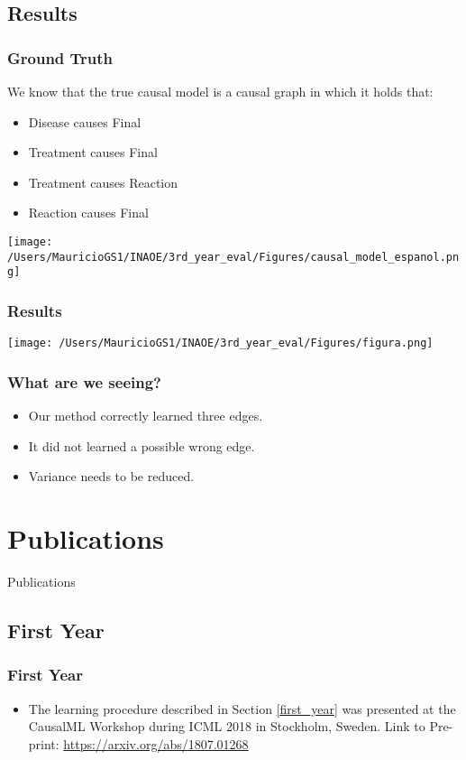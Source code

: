 \documentclass{beamer}
\theoremstyle{plain}
\begin{document}
\subsection{Results}
\begin{frame}
\frametitle{Ground Truth}
We know that the true causal model is a causal graph in which it holds that:
\begin{itemize}
\item Disease causes Final
\item Treatment causes Final
\item Treatment causes Reaction
\item Reaction causes Final
\end{itemize}
\end{frame}

\begin{frame}
\texttt{[image: /Users/MauricioGS1/INAOE/3rd\_year\_eval/Figures/causal\_model\_espanol.png]}
\end{frame}

\begin{frame}
\frametitle{Results}
\texttt{[image: /Users/MauricioGS1/INAOE/3rd\_year\_eval/Figures/figura.png]}
\end{frame}

\begin{frame}
\frametitle{What are we seeing?}
\begin{itemize}
\item Our method correctly learned three edges.
\item It did not learned a possible wrong edge. 
\item Variance needs to be reduced. 
\end{itemize}
\end{frame}

\section{Publications}
\begin{frame}
\begin{center}
\LARGE{Publications}
\end{center}
\end{frame}

\subsection{First Year}
\begin{frame}
\frametitle{First Year}
\begin{itemize}
\item The learning procedure described in Section \ref{first_year} was presented at the CausalML Workshop during ICML 2018 in Stockholm, Sweden. Link to Pre-print: \url{https://arxiv.org/abs/1807.01268}
\end{itemize}
\end{frame}
\end{document}
